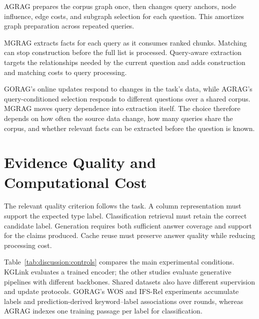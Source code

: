 AGRAG prepares the corpus graph once, then changes query anchors, node influence, edge costs, and subgraph selection for each question. This amortizes graph preparation across repeated queries.

MGRAG extracts facts for each query as it consumes ranked chunks. Matching can stop construction before the full list is processed. Query-aware extraction targets the relationships needed by the current question and adds construction and matching costs to query processing.

GORAG's online updates respond to changes in the task's data, while AGRAG's query-conditioned selection responds to different questions over a shared corpus. MGRAG moves query dependence into extraction itself. The choice therefore depends on how often the source data change, how many queries share the corpus, and whether relevant facts can be extracted before the question is known.

\section{Evidence Quality and Computational Cost}
\label{sec:discussion:cost}
The relevant quality criterion follows the task. A column representation must support the expected type label. Classification retrieval must retain the correct candidate label. Generation requires both sufficient answer coverage and support for the claims produced. Cache reuse must preserve answer quality while reducing processing cost.

Table~\ref{tab:discussion:controls} compares the main experimental conditions. KGLink evaluates a trained encoder; the other studies evaluate generative pipelines with different backbones. Shared datasets also have different supervision and update protocols. GORAG's WOS and IFS-Rel experiments accumulate labels and prediction-derived keyword--label associations over rounds, whereas AGRAG indexes one training passage per label for classification.


